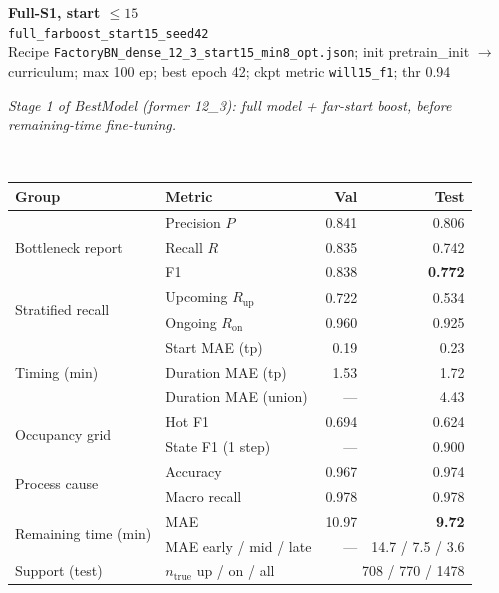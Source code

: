 \documentclass[9pt,a4paper,twocolumn]{extarticle}
\begin{document}
\noindent\begin{minipage}{\columnwidth}
\begin{center}
{\small\bfseries Full-S1, start $\le 15$}\\
{\scriptsize\texttt{full\_farboost\_start15\_seed42}}\\
{\scriptsize Recipe \texttt{FactoryBN\_dense\_12\_3\_start15\_min8\_opt.json}; init pretrain\_init $\to$ curriculum; max 100 ep; best epoch 42; ckpt metric \texttt{will15\_f1}; thr 0.94}\\[1pt]
\parbox{0.96\columnwidth}{\scriptsize\itshape Stage 1 of BestModel (former 12\_3): full model + far-start boost, before remaining-time fine-tuning.}\\[2pt]
\scriptsize\setlength{\tabcolsep}{3pt}
\begin{tabular}{llrr}
\toprule
Group & Metric & Val & Test \\
\midrule
\multirow{3}{*}{Bottleneck report}
  & Precision $P$ & 0.841 & 0.806 \\
  & Recall $R$ & 0.835 & 0.742 \\
  & F1 & 0.838 & \textbf{0.772} \\
\midrule
\multirow{2}{*}{Stratified recall}
  & Upcoming $R_{\mathrm{up}}$ & 0.722 & 0.534 \\
  & Ongoing $R_{\mathrm{on}}$ & 0.960 & 0.925 \\
\midrule
\multirow{3}{*}{Timing (min)}
  & Start MAE (tp) & 0.19 & 0.23 \\
  & Duration MAE (tp) & 1.53 & 1.72 \\
  & Duration MAE (union) & --- & 4.43 \\
\midrule
\multirow{2}{*}{Occupancy grid}
  & Hot F1 & 0.694 & 0.624 \\
  & State F1 (1 step) & --- & 0.900 \\
\midrule
\multirow{2}{*}{Process cause}
  & Accuracy & 0.967 & 0.974 \\
  & Macro recall & 0.978 & 0.978 \\
\midrule
\multirow{2}{*}{Remaining time (min)}
  & MAE & 10.97 & \textbf{9.72} \\
  & MAE early / mid / late & --- & 14.7 / 7.5 / 3.6 \\
\midrule
Support (test)
  & $n_{\mathrm{true}}$ up / on / all & \multicolumn{2}{r}{708 / 770 / 1478} \\
\bottomrule
\end{tabular}
\end{center}
\end{minipage}\par\vspace{6pt}
\end{document}
